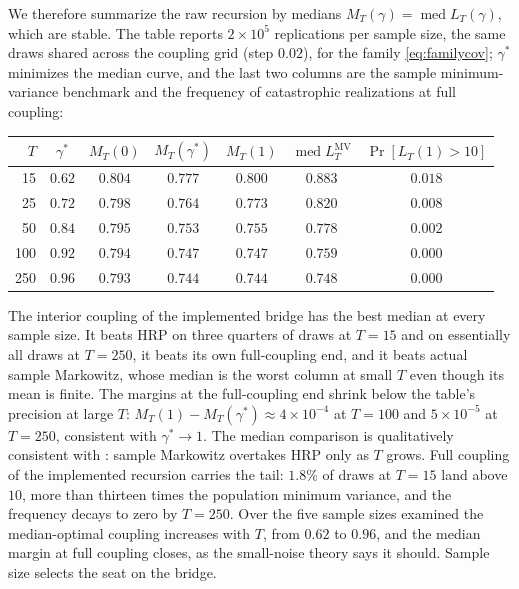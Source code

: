 \documentclass[11pt]{article}
\theoremstyle{remark}
\begin{document}
We therefore summarize the raw recursion by medians
$M_T(\gamma) = \operatorname{med} L_T(\gamma)$, which are stable. The
table reports $2 \times 10^5$ replications per sample size, the same
draws shared across the coupling grid (step $0.02$), for the family
\eqref{eq:familycov}; $\gamma^*$ minimizes the median curve, and the
last two columns are the sample minimum-variance benchmark and the
frequency of catastrophic realizations at full coupling:
\begin{center}
\begin{tabular}{rcccccc}
\toprule
$T$ & $\gamma^*$ & $M_T(0)$ & $M_T(\gamma^*)$ & $M_T(1)$ &
$\operatorname{med} L_T^{\mathrm{MV}}$ & $\Pr[L_T(1) > 10]$ \\
\midrule
 15 & $0.62$ & $0.804$ & $0.777$ & $0.800$ & $0.883$ & $0.018$ \\
 25 & $0.72$ & $0.798$ & $0.764$ & $0.773$ & $0.820$ & $0.008$ \\
 50 & $0.84$ & $0.795$ & $0.753$ & $0.755$ & $0.778$ & $0.002$ \\
100 & $0.92$ & $0.794$ & $0.747$ & $0.747$ & $0.759$ & $0.000$ \\
250 & $0.96$ & $0.793$ & $0.744$ & $0.744$ & $0.748$ & $0.000$ \\
\bottomrule
\end{tabular}
\end{center}
The interior coupling of the implemented bridge has the best median at
every sample size. It beats HRP on three quarters of draws at $T = 15$
and on essentially all draws at $T = 250$, it beats its own full-coupling
end, and it beats actual sample Markowitz, whose median is the worst
column at small $T$ even though its mean is finite. The margins at the
full-coupling end shrink below the table's precision at large $T$:
$M_T(1) - M_T(\gamma^*) \approx 4 \times 10^{-4}$ at $T = 100$ and
$5 \times 10^{-5}$ at $T = 250$, consistent with $\gamma^* \to 1$. The median
comparison is qualitatively consistent with \cite{antonov2025}: sample
Markowitz overtakes HRP only as $T$ grows. Full coupling of the
implemented recursion carries the tail: $1.8\%$ of draws at $T = 15$
land above $10$, more than thirteen times the population minimum
variance, and the frequency decays to zero by $T = 250$. Over the five
sample sizes examined the median-optimal coupling increases with $T$,
from $0.62$ to $0.96$, and the median margin at full coupling closes, as
the small-noise theory says it should. Sample size selects the seat on
the bridge.
\end{document}
